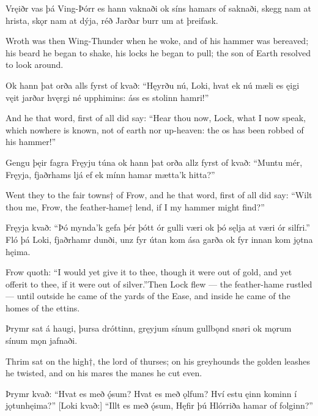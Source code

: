 Vręiðr vas þá Ving-Þórr \hld es hann vaknaði
ok síns hamars \hld of saknaði,
skegg nam at hrista, \hld skǫr nam at dýja,
réð Jarðar burr \hld um at þreifask.

Wroth was then Wing-Thunder when he woke, and of his hammer was bereaved; his beard he began to shake, his locks he began to pull; the son of Earth resolved to look around.

Ok hann þat orða \hld alls fyrst of kvað:
“Hęyrðu nú, Loki, \hld hvat ek nú mæli
es ęigi vęit \hld jarðar hvęrgi
né upphimins: \hld áss es stolinn hamri!”

And he that word, first of all did say: “Hear thou now, Lock, what I now speak, which nowhere is known, not of earth nor up-heaven: the os has been robbed of his hammer!”

Gengu þęir fagra \hld Fręyju túna
ok hann þat orða \hld allz fyrst of kvað:
“Muntu mér, Fręyja, \hld fjaðrhams ljá
ef ek mínn hamar \hld mætta’k hitta?”

Went they to the fair towns† of Frow, and he that word, first of all did say: “Wilt thou me, Frow, the feather-hame† lend, if I my hammer might find?”

Fręyja kvað:
“Þó mynda’k gefa þér \hld þótt ór gulli væri
ok þó sęlja \hld at væri ór silfri.”
Fló þá Loki, \hld fjaðrhamr dunði,
unz fyr útan kom \hld ása garða
ok fyr innan kom \hld jǫtna hęima. 

Frow quoth:
“I would yet give it to thee, though it were out of gold, and yet offer\footnotemark[1] it to thee, if it were out of silver.”\footnotemark[2] Then Lock flew — the feather-hame rustled — until outside he came of the yards of the Ease, and inside he came of the homes of the ettins.

Þrymr sat á haugi, \hld þursa dróttinn,
gręyjum sínum \hld gullbǫnd snøri
ok mǫrum sínum \hld mǫn jafnaði. 

Thrim sat on the high†, the lord of thurses; on his greyhounds the golden leashes he twisted, and on his mares the manes he cut even.

Þrymr kvað:
“Hvat es með ǫ́sum? \hld Hvat es með ǫlfum?
Hví estu ęinn kominn \hld í jǫtunhęima?”
[Loki kvað:]
“Illt es með ǫ́sum, \footnotemark[1]
Hęfir þú Hlórriða \hld hamar of folginn?”

